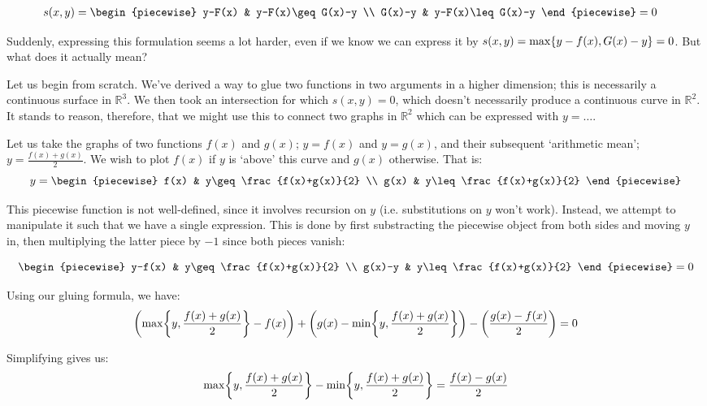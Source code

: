 \begin{align*}
    s(x,y) &= \begin{piecewise}
        y-F(x) & y-F(x)\geq G(x)-y \\
        G(x)-y & y-F(x)\leq G(x)-y
    \end{piecewise} = 0
\end{align*}

Suddenly, expressing this formulation seems a lot harder, even if we know we can express it by $s(x,y)=\max\{y-f(x),G(x)-y\}=0$. But what does it actually mean?

Let us begin from scratch. We've derived a way to glue two functions in two arguments in a higher dimension; this is necessarily a continuous surface in $\mathbb{R}^3$. We then took an intersection for which $s(x,y)=0$, which doesn't necessarily produce a continuous curve in $\mathbb{R}^2$. It stands to reason, therefore, that we might use this to connect two graphs in $\mathbb{R}^2$ which can be expressed with $y=\dots$.

Let us take the graphs of two functions $f(x)$ and $g(x)$; $y=f(x)$ and $y=g(x)$, and their subsequent `arithmetic mean'; $y=\frac{f(x)+g(x)}{2}$. We wish to plot $f(x)$ if $y$ is `above' this curve and $g(x)$ otherwise. That is:
$$
    y = \begin{piecewise}
        f(x) & y\geq \frac{f(x)+g(x)}{2} \\
        g(x) & y\leq \frac{f(x)+g(x)}{2}
    \end{piecewise}
$$

This piecewise function is not well-defined, since it involves recursion on $y$ (i.e. substitutions on $y$ won't work). Instead, we attempt to manipulate it such that we have a single expression. This is done by first substracting the piecewise object from both sides and moving $y$ in, then multiplying the latter piece by $-1$ since both pieces vanish:

$$
    \begin{piecewise}
        y-f(x) & y\geq \frac{f(x)+g(x)}{2} \\
        g(x)-y & y\leq \frac{f(x)+g(x)}{2}
    \end{piecewise} = 0
$$

Using our gluing formula, we have:
$$
    \paren*{\max\br*{y,\frac{f(x)+g(x)}{2}}-f(x)}+\paren*{g(x)-\min\br*{y,\frac{f(x)+g(x)}{2}}}-\paren*{\frac{g(x)-f(x)}{2}}=0
$$

Simplifying gives us:
$$
    \max\br*{y,\frac{f(x)+g(x)}{2}}-\min\br*{y,\frac{f(x)+g(x)}{2}}=\frac{f(x)-g(x)}{2}
$$

